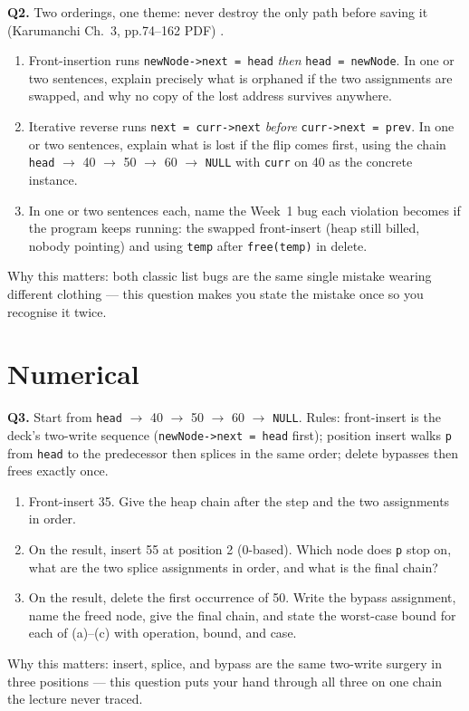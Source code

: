 \documentclass[11pt]{article}
\begin{document}
\textbf{Q2.} Two orderings, one theme: never destroy the only path before saving it (Karumanchi Ch.~3, pp.74--162 PDF) \cite{Karumanchi2017_data_structures_algorithms_made_easy}.
\begin{enumerate}
  \item[(a)] Front-insertion runs \texttt{newNode->next = head} \emph{then} \texttt{head = newNode}. In one or two sentences, explain precisely what is orphaned if the two assignments are swapped, and why no copy of the lost address survives anywhere.
  \item[(b)] Iterative reverse runs \texttt{next = curr->next} \emph{before} \texttt{curr->next = prev}. In one or two sentences, explain what is lost if the flip comes first, using the chain \texttt{head} $\to$ 40 $\to$ 50 $\to$ 60 $\to$ \texttt{NULL} with \texttt{curr} on 40 as the concrete instance.
  \item[(c)] In one or two sentences each, name the Week~1 bug each violation becomes if the program keeps running: the swapped front-insert (heap still billed, nobody pointing) and using \texttt{temp} after \texttt{free(temp)} in delete.
\end{enumerate}
Why this matters: both classic list bugs are the same single mistake wearing different clothing --- this question makes you state the mistake once so you recognise it twice.

\section{Numerical}

\textbf{Q3.} Start from \texttt{head} $\to$ 40 $\to$ 50 $\to$ 60 $\to$ \texttt{NULL}. Rules: front-insert is the deck's two-write sequence (\texttt{newNode->next = head} first); position insert walks \texttt{p} from \texttt{head} to the predecessor then splices in the same order; delete bypasses then frees exactly once.
\begin{enumerate}
  \item[(a)] Front-insert 35. Give the heap chain after the step and the two assignments in order.
  \item[(b)] On the result, insert 55 at position 2 (0-based). Which node does \texttt{p} stop on, what are the two splice assignments in order, and what is the final chain?
  \item[(c)] On the result, delete the first occurrence of 50. Write the bypass assignment, name the freed node, give the final chain, and state the worst-case bound for each of (a)--(c) with operation, bound, and case.
\end{enumerate}
Why this matters: insert, splice, and bypass are the same two-write surgery in three positions --- this question puts your hand through all three on one chain the lecture never traced.
\end{document}
